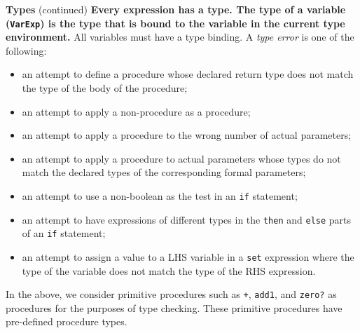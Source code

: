 \begin{minipage}[t]{\sw}
\slidenumber
\LARGE
{\bf Types} (continued)\exx
{\bf Every expression has a type.
The type of a variable (\verb'VarExp')
is the type that is bound to the variable
in the current type environment.}
All variables must have a type binding.\exx
A {\em type error} is one of the following:
\begin{itemize}
\itemsep -0.5ex
\item an attempt to define a procedure whose declared return type
      does not match the type of the body of the procedure;
\item an attempt to apply a non-procedure as a procedure;
\item an attempt to apply a procedure to the wrong number
      of actual parameters;
\item an attempt to apply a procedure to actual parameters whose types
      do not match the declared types
      of the corresponding formal parameters;
\item an attempt to use a non-boolean as the test in an \verb'if' statement;
\item an attempt to have expressions of different types
      in the \verb'then' and \verb'else' parts of an \verb'if' statement;
\item an attempt to assign a value
      to a LHS variable in a \verb'set' expression
      where the type of the variable does not match the type
      of the RHS expression.
\end{itemize}
In the above, we consider primitive procedures
such as \verb'+', \verb'add1', and \verb'zero?' as procedures
for the purposes of type checking.
These primitive procedures have pre-defined procedure types.
\end{minipage}
